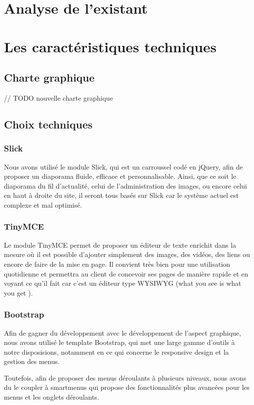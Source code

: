 \documentclass[11pt]{report}
\begin{document}
\chapter{Analyse de l'existant}
\chapter{Les caractéristiques techniques}
\section{Charte graphique}
// TODO nouvelle charte graphique
\section{Choix techniques}
\subsection{Slick}
Nous avons utilisé le module Slick, qui est un carroussel codé en jQuery, afin
de proposer un diaporama fluide, efficace et personnalisable. Ainsi, que ce soit
le diaporama du fil d'actualité, celui de l'administration des images, ou encore
celui en haut à droite du site, il seront tous basés sur Slick car le système
actuel est complexe et mal optimisé.

\subsection{TinyMCE}
Le module TinyMCE permet de proposer un éditeur de texte enrichit dans la mesure
où il est possible d'ajouter simplement des images, des vidéos, des liens ou
encore de faire de la mise en page. Il convient très bien pour une utilisation
quotidienne et permettra au client de concevoir ses pages de manière rapide et
en voyant ce qu'il fait car c'est un éditeur type \og WYSIWYG \fg{} (\og what you
see is what you get \fg{}).

\subsection{Bootstrap}
Afin de gagner du développement avec le développement de l'aspect graphique,
nous avons utilisé le template Bootstrap, qui met une large gamme d'outils à
notre disposisions, notamment en ce qui concerne le responsive design et la
gestion des menus. \\
\par Toutefois, afin de proposer des menus déroulants à plusieurs niveaux, nous
avons du le coupler à \og smartmenus \fg{} qui propose des fonctionnalités plus
avancées pour les menus et les onglets déroulants.
\end{document}
